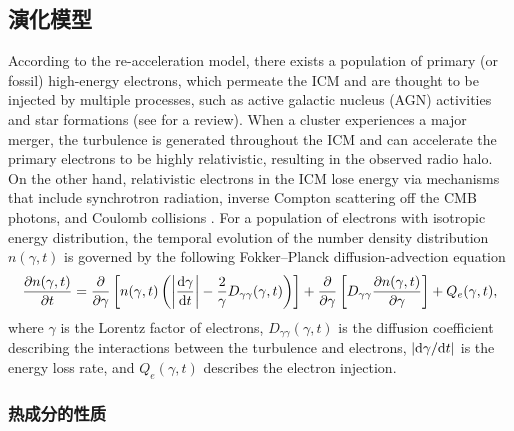 \subsection{演化模型}
\label{sec:halo-evo}

According to the re-acceleration model, there exists a population of
primary (or fossil) high-energy electrons, which permeate the ICM and
are thought to be injected by multiple processes, such as active
galactic nucleus (AGN) activities and star formations
(see  for a review).
When a cluster experiences a major merger, the turbulence is generated
throughout the ICM and can accelerate the primary electrons to be highly
relativistic, resulting in the observed radio halo.
On the other hand, relativistic electrons in the ICM lose energy via
mechanisms that include synchrotron radiation, inverse Compton scattering
off the CMB photons, and Coulomb collisions \cite{sarazin1999}.
For a population of electrons with isotropic energy distribution, the
temporal evolution of the number density distribution $n(\gamma, t)$
is governed by the following Fokker--Planck diffusion-advection equation
\cite{eilek1991,schlickeiser2002}
\begin{equation}
  \label{eq:fokkerplanck}
  \frac{\partial n(\gamma,t)}{\partial t} = \frac{\partial }{\partial \gamma} \left[ n(\gamma,t) \left(
      \left| \frac{\mathrm{d}\gamma}{\mathrm{d}t} \right| -
      \frac{2}{\gamma} D_{\gamma\gamma}(\gamma, t) \right) \right]
    + \frac{\partial }{\partial \gamma} \left[ D_{\gamma\gamma} \frac{\partial n(\gamma,t)}{\partial \gamma}
    \right] + Q_e(\gamma,t),
\end{equation}
where $\gamma$ is the Lorentz factor of electrons,
$D_{\gamma\gamma}(\gamma, t)$ is the diffusion coefficient describing
the interactions between the turbulence and electrons,
$|\mathrm{d}\gamma / \mathrm{d}t|$ is the energy loss rate,
and $Q_e(\gamma, t)$ describes the electron injection.

\subsubsection{热成分的性质}

